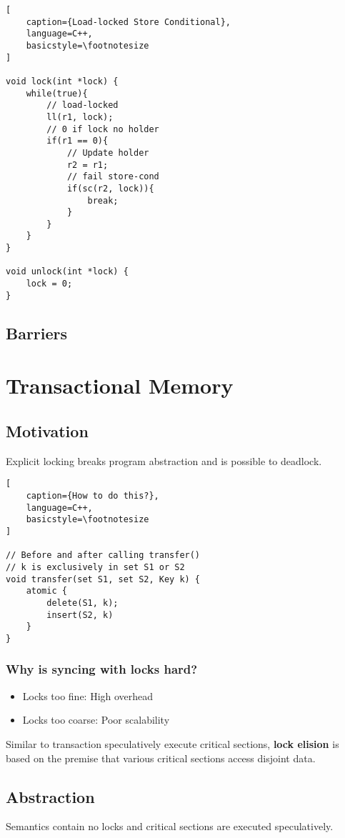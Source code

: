 \documentclass{article}
\begin{document}
\begin{multicols*}{2}
\begin{lstlisting}[
    caption={Load-locked Store Conditional},
    language=C++, 
    basicstyle=\footnotesize
]

void lock(int *lock) {
    while(true){
        // load-locked
        ll(r1, lock);
        // 0 if lock no holder
        if(r1 == 0){
            // Update holder
            r2 = r1;
            // fail store-cond
            if(sc(r2, lock)){
                break;
            }
        }
    }
}

void unlock(int *lock) {
    lock = 0;
}
\end{lstlisting}

\subsection{Barriers}

\section{Transactional Memory}
\subsection{Motivation}
Explicit locking breaks program abstraction and is possible to deadlock.

\begin{lstlisting}[
    caption={How to do this?},
    language=C++, 
    basicstyle=\footnotesize
]

// Before and after calling transfer()
// k is exclusively in set S1 or S2
void transfer(set S1, set S2, Key k) {
    atomic {
        delete(S1, k);
        insert(S2, k)
    }
}
\end{lstlisting}

\subsubsection{Why is syncing with locks hard?}
\begin{itemize}
    \item Locks too fine: High overhead
    \item Locks too coarse: Poor scalability
\end{itemize}
Similar to transaction speculatively execute critical sections, \textbf{lock elision} is based on the premise that various critical sections access disjoint data.

\subsection{Abstraction}
Semantics contain no locks and critical sections are executed speculatively.


\end{multicols*}
\end{document}
